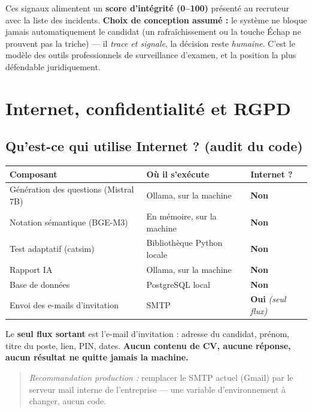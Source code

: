 \documentclass[11pt,a4paper]{article}
\begin{document}
Ces signaux alimentent un \textbf{score d'intégrité (0--100)} présenté au recruteur avec
la liste des incidents. \textbf{Choix de conception assumé :} le système ne bloque
jamais automatiquement le candidat (un rafraîchissement ou la touche Échap ne prouvent
pas la triche) --- il \emph{trace et signale}, la décision reste \emph{humaine}. C'est
le modèle des outils professionnels de surveillance d'examen, et la position la plus
défendable juridiquement.

\section{Internet, confidentialité et RGPD}

\subsection{Qu'est-ce qui utilise Internet ? (audit du code)}
\begin{center}
\begin{tabularx}{\textwidth}{Xp{4.6cm}>{\centering\arraybackslash}p{2.2cm}}
\toprule
\textbf{Composant} & \textbf{Où il s'exécute} & \textbf{Internet ?} \\
\midrule
Génération des questions (Mistral 7B) & Ollama, sur la machine & \textcolor{vertok}{\textbf{Non}} \\
Notation sémantique (BGE-M3) & En mémoire, sur la machine & \textcolor{vertok}{\textbf{Non}} \\
Test adaptatif (catsim) & Bibliothèque Python locale & \textcolor{vertok}{\textbf{Non}} \\
Rapport IA & Ollama, sur la machine & \textcolor{vertok}{\textbf{Non}} \\
Base de données & PostgreSQL local & \textcolor{vertok}{\textbf{Non}} \\
Envoi des e-mails d'invitation & SMTP & \textcolor{rougeko}{\textbf{Oui}} \emph{(seul flux)} \\
\bottomrule
\end{tabularx}
\end{center}

Le \textbf{seul flux sortant} est l'e-mail d'invitation : adresse du candidat, prénom,
titre du poste, lien, PIN, dates. \textbf{Aucun contenu de CV, aucune réponse, aucun
résultat ne quitte jamais la machine.}

\begin{quote}
\emph{Recommandation production :} remplacer le SMTP actuel (Gmail) par le serveur mail
interne de l'entreprise --- une variable d'environnement à changer, aucun code.
\end{quote}
\end{document}
